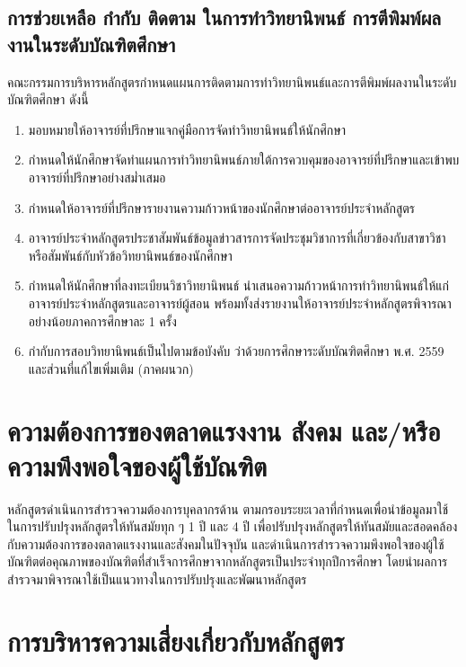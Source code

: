   \subsection{การช่วยเหลือ กำกับ ติดตาม ในการทำวิทยานิพนธ์ การตีพิมพ์ผลงานในระดับบัณฑิตศึกษา} 
  คณะกรรมการบริหารหลักสูตรกำหนดแผนการติดตามการทำวิทยานิพนธ์และการตีพิมพ์ผลงานในระดับบัณฑิตศึกษา ดังนี้ 
 \begin{enumerate}
   	\item มอบหมายให้อาจารย์ที่ปรึกษาแจกคู่มือการจัดทำวิทยานิพนธ์ให้นักศึกษา   
   	\item กำหนดให้นักศึกษาจัดทำแผนการทำวิทยานิพนธ์ภายใต้การควบคุมของอาจารย์ที่ปรึกษาและเข้าพบอาจารย์ที่ปรึกษาอย่างสม่ำเสมอ
   	\item กำหนดให้อาจารย์ที่ปรึกษารายงานความก้าวหน้าของนักศึกษาต่ออาจารย์ประจำหลักสูตร  	  
   	\item อาจารย์ประจำหลักสูตรประชาสัมพันธ์ข้อมูลข่าวสารการจัดประชุมวิชาการที่เกี่ยวข้องกับสาขาวิชาหรือสัมพันธ์กับหัวข้อวิทยานิพนธ์ของนักศึกษา
   	\item กำหนดให้นักศึกษาที่ลงทะเบียนวิชาวิทยานิพนธ์ นำเสนอความก้าวหน้าการทำวิทยานิพนธ์ให้แก่อาจารย์ประจำหลักสูตรและอาจารย์ผู้สอน พร้อมทั้งส่งรายงานให้อาจารย์ประจำหลักสูตรพิจารณาอย่างน้อยภาคการศึกษาละ 1 ครั้ง  	
   	\item  กำกับการสอบวิทยานิพนธ์เป็นไปตามข้อบังคับ\university{} ว่าด้วยการศึกษาระดับบัณฑิตศึกษา พ.ศ. 2559 และส่วนที่แก้ไขเพิ่มเติม (ภาคผนวก)   	 
   	\end{enumerate}   
   
\section{ความต้องการของตลาดแรงงาน สังคม และ/หรือความพึงพอใจของผู้ใช้บัณฑิต}
หลักสูตรดำเนินการสำรวจความต้องการบุคลากรด้าน\thdegreebranch{} ตามกรอบระยะเวลาที่กำหนดเพื่อนำข้อมูลมาใช้ในการปรับปรุงหลักสูตรให้ทันสมัยทุก ๆ 1 ปี และ 4 ปี เพื่อปรับปรุงหลักสูตรให้ทันสมัยและสอดคล้องกับความต้องการของตลาดแรงงานและสังคมในปัจจุบัน และดำเนินการสำรวจความพึงพอใจของผู้ใช้บัณฑิตต่อคุณภาพของบัณฑิตที่สำเร็จการศึกษาจากหลักสูตรเป็นประจำทุกปีการศึกษา โดยนำผลการสำรวจมาพิจารณาใช้เป็นแนวทางในการปรับปรุงและพัฒนาหลักสูตร


\section{การบริหารความเสี่ยงเกี่ยวกับหลักสูตร}
